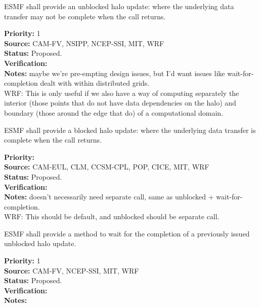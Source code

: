  \label{DG:halo}



ESMF shall provide an unblocked halo update: where the underlying
data transfer may not be complete when the call returns.

\begin{reqlist}
{\bf Priority:} 1 \\ 
{\bf Source:} CAM-FV, NSIPP, NCEP-SSI, MIT, WRF \\
{\bf Status:} Proposed. \\
{\bf Verification:} \\
{\bf Notes:} maybe we're pre-empting design issues, but I'd want
  issues like wait-for-completion dealt with within distributed grids.
\\WRF: This is only useful if we also have a way of computing separately the
interior (those points that do not have data dependencies on the halo)
and boundary (those around the edge that do)
of a computational domain.
\end{reqlist}


ESMF shall provide a blocked halo update: where the underlying
data transfer is complete when the call returns.

\begin{reqlist}
{\bf Priority:} \\
{\bf Source:} CAM-EUL, CLM, CCSM-CPL, POP, CICE, MIT, WRF \\
{\bf Status:} Proposed. \\
{\bf Verification:} \\
{\bf Notes:} doesn't necessarily need separate call, same as unblocked
  + wait-for-completion.
\\WRF: This should be default, and unblocked should be separate call.
\end{reqlist}


ESMF shall provide a method to wait for the completion of a previously
issued unblocked halo update.

\begin{reqlist}
{\bf Priority:} 1 \\ 
{\bf Source:} CAM-FV, NCEP-SSI, MIT, WRF \\
{\bf Status:} Proposed. \\
{\bf Verification:} \\
{\bf Notes:}
\end{reqlist}

